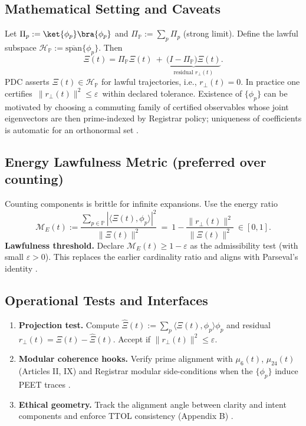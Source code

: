 \documentclass[12pt]{amsart}
\theoremstyle{plain}
\begin{document}
\subsection{Mathematical Setting and Caveats}
Let $\Pi_p:=\ket{\phi_p}\bra{\phi_p}$ and $\Pi_{\mathbb{P}}:=\sum_{p}\Pi_p$ (strong limit). Define the lawful subspace $\mathcal{H}_{\mathbb{P}}:=\overline{\mathrm{span}}\{\phi_p\}$. Then
\[
\Xi(t)=\Pi_{\mathbb{P}}\Xi(t)\ +\ \underbrace{\big(I-\Pi_{\mathbb{P}}\big)\Xi(t)}_{\text{residual } r_\perp(t)}.
\]
PDC asserts $\Xi(t)\in\mathcal{H}_{\mathbb{P}}$ for lawful trajectories, i.e., $r_\perp(t)=0$. In practice one certifies $\,\|r_\perp(t)\|^2\le\varepsilon\,$ within declared tolerance. Existence of $\{\phi_p\}$ can be motivated by choosing a commuting family of certified observables whose joint eigenvectors are then prime-indexed by Registrar policy; uniqueness of coefficients is automatic for an orthonormal set \cite{rudin1991functional,conway1990functional}.

\subsection{Energy Lawfulness Metric (preferred over counting)}
Counting components is brittle for infinite expansions. Use the energy ratio
\[
\mathcal{M}_E(t):=\frac{\sum_{p\in\mathbb{P}}|\langle \Xi(t),\phi_p\rangle|^2}{\|\Xi(t)\|^2}\ =\ 1-\frac{\|r_\perp(t)\|^2}{\|\Xi(t)\|^2}\ \in[0,1].
\]
\textbf{Lawfulness threshold.} Declare $\mathcal{M}_E(t)\ge 1-\varepsilon$ as the admissibility test (with small $\varepsilon>0$). This replaces the earlier cardinality ratio and aligns with Parseval’s identity \cite{lax2002functional,rudin1991functional}.

\subsection{Operational Tests and Interfaces}
\begin{enumerate}
  \item \textbf{Projection test.} Compute $\widehat{\Xi}(t):=\sum_{p}\langle \Xi(t),\phi_p\rangle\phi_p$ and residual $r_\perp(t)=\Xi(t)-\widehat{\Xi}(t)$. Accept if $\|r_\perp(t)\|^2\le\varepsilon$.
  \item \textbf{Modular coherence hooks.} Verify prime alignment with $\mu_6(t)$, $\mu_{24}(t)$ (Articles II, IX) and Registrar modular side-conditions when the $\{\phi_p\}$ induce PEET traces \cite{diamond2005first,iwaniec2002spectral}.
  \item \textbf{Ethical geometry.} Track the alignment angle between clarity and intent components and enforce TTOL consistency (Appendix B) \cite{lax2002functional}.
\end{enumerate}
\end{document}
